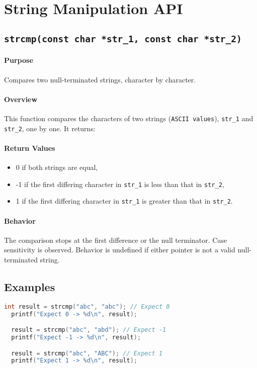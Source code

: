 \newpage
\section{String Manipulation API}
\subsection{\texttt{strcmp(const char *str\_1, const char *str\_2)}}

\paragraph{Purpose}
Compares two null-terminated strings, character by character.

\paragraph{Overview}
This function compares the characters of two strings (\texttt{ASCII values}), 
\texttt{str\_1} and \texttt{str\_2}, one by one. It returns:

\paragraph{Return Values}
\begin{itemize}
    \item 0 if both strings are equal,
    \item -1 if the first differing character in \texttt{str\_1} is less than that in \texttt{str\_2},
    \item 1 if the first differing character in \texttt{str\_1} is greater than that in \texttt{str\_2}.
\end{itemize}

\paragraph{Behavior}
The comparison stops at the first difference or the null terminator. 
Case sensitivity is observed. Behavior is undefined if either pointer is not a 
valid null-terminated string.

\subsection*{Examples}
\begin{lstlisting}[language=C, caption=String Comparison Example]
  int result = strcmp("abc", "abc"); // Expect 0
  printf("Expect 0 -> %d\n", result);

  result = strcmp("abc", "abd"); // Expect -1
  printf("Expect -1 -> %d\n", result);

  result = strcmp("abc", "ABC"); // Expect 1
  printf("Expect 1 -> %d\n", result);
\end{lstlisting}

